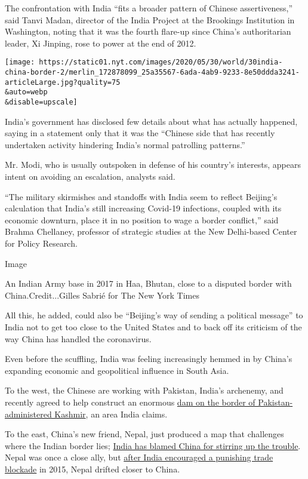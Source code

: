 The confrontation with India ``fits a broader pattern of Chinese
assertiveness,'' said Tanvi Madan, director of the India Project at the
Brookings Institution in Washington, noting that it was the fourth
flare-up since China's authoritarian leader, Xi Jinping, rose to power
at the end of 2012.

\texttt{[image: https://static01.nyt.com/images/2020/05/30/world/30india-china-border-2/merlin\_172878099\_25a35567-6ada-4ab9-9233-8e50ddda3241-articleLarge.jpg?quality=75\\\&auto=webp\\\&disable=upscale]}

India's government has disclosed few details about what has actually
happened, saying in a statement only that it was the ``Chinese side that
has recently undertaken activity hindering India's normal patrolling
patterns.''

Mr. Modi, who is usually outspoken in defense of his country's
interests, appears intent on avoiding an escalation, analysts said.

``The military skirmishes and standoffs with India seem to reflect
Beijing's calculation that India's still increasing Covid-19 infections,
coupled with its economic downturn, place it in no position to wage a
border conflict,'' said Brahma Chellaney, professor of strategic studies
at the New Delhi-based Center for Policy Research.

Image

An Indian Army base in 2017 in Haa, Bhutan, close to a disputed border
with China.Credit...Gilles Sabrié for The New York Times

All this, he added, could also be ``Beijing's way of sending a political
message'' to India not to get too close to the United States and to back
off its criticism of the way China has handled the coronavirus.

Even before the scuffling, India was feeling increasingly hemmed in by
China's expanding economic and geopolitical influence in South Asia.

To the west, the Chinese are working with Pakistan, India's archenemy,
and recently agreed to help construct an enormous
\href{https://asia.nikkei.com/Spotlight/Belt-and-Road/China-ignores-India-over-dam-project-in-Pakistani-Kashmir}{dam
on the border of Pakistan-administered Kashmir}, an area India claims.

To the east, China's new friend, Nepal, just produced a map that
challenges where the Indian border lies;
\href{https://thewire.in/external-affairs/army-chief-general-m-m-naravane-nepal-lipulekh-china}{India
has blamed China for stirring up the trouble}. Nepal was once a close
ally, but
\href{https://www.cfr.org/blog/bilateral-mishap-view-nepal}{after India
encouraged a punishing trade blockade} in 2015, Nepal drifted closer to
China.

